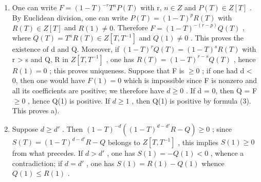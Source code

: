 \begin{enumerate}
\def\labelenumi{\alph{enumi})}
\item
  One can write \(F = (1 - T)^{-r} T^{n} P(T)\) with r, \(n \in Z\) and \(P(T) \in Z[T]\) . By Euclidean division, one can write \(P(T) = (1 - T)^{p} R(T)\) with \(R(T) \in Z[T]\) and \(R(1) \neq 0\). Therefore \(F = (1 - T)^{-(r-p)} Q(T)\) , where \(Q(T) = T^{n} R(T) \in Z[T, T^{-1}]\) and \(Q(1) \neq 0\) . This proves the existence of d and Q. Moreover, if \((1 - T)^{r} Q(T) = (1 - T)^{s} R(T)\) with r \textgreater{} s and Q, R in \(Z[T, T^{-1}]\) , one has \(R(T) = (1 - T)^{r-s} Q(T)\) , hence \(R(1) = 0\) ; this proves uniqueness. Suppose that F is \(\geqslant 0\) ; if one had d \textless{} 0, then one would have \(F(1) = 0\) which is impossible since F is nonzero and all its coefficients are positive; we therefore have \(d \geqslant 0\) . If d = 0, then Q = F \(\geqslant 0\) , hence Q(1) is positive. If \(d \geqslant 1\) , then Q(1) is positive by formula (3). This proves a).
\item
  Suppose \(d \geqslant d'\) . Then \((1 - T)^{-d}((1 - T)^{d - d'} R - Q) \geqslant 0\) ; since \(S(T) = (1 - T)^{d - d'} R - Q\) belongs to \(Z[T, T^{-1}]\) , this implies \(S(1) \geqslant 0\) from what precedes. If \(d > d'\) , one has \(S(1) = -Q(1) < 0\) , whence a contradiction; if \(d = d'\) , one has \(S(1) = R(1) - Q(1)\) whence \(Q(1) \leqslant R(1)\) .
\end{enumerate}

